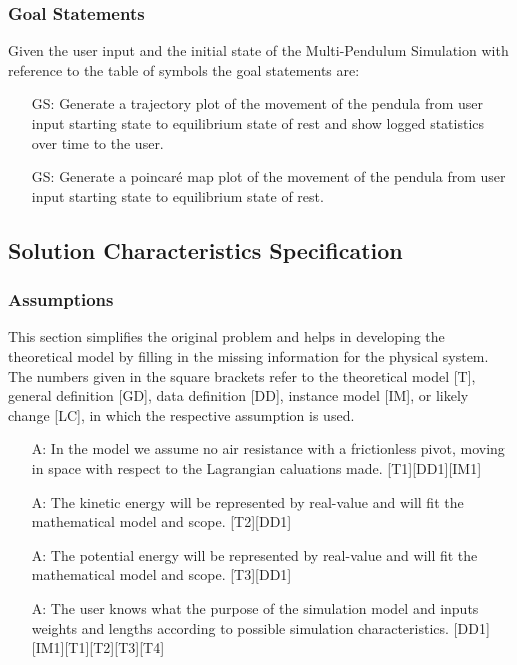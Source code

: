 \documentclass[12pt]{article}
\newcounter{assumpnum} %
\newcounter{goalnum} %
\newcommand{\progname}{Multi-Pendulum Simulation }
\begin{document}
\subsubsection{Goal Statements}

\noindent Given the user input and the initial state of the \progname with reference to the table of symbols the goal
statements are:

\begin{itemize}
\item[GS\refstepcounter{goalnum}\thegoalnum:] Generate a trajectory plot of 
the movement of the pendula from user input starting state to equilibrium state of rest and show logged
statistics over time to the user.
\item[GS\refstepcounter{goalnum}\thegoalnum:] Generate a poincaré map plot of 
the movement of the pendula from user input starting state to equilibrium state of rest.
\end{itemize}


\newpage

\subsection{Solution Characteristics Specification}

\subsubsection{Assumptions}

This section simplifies the original problem and helps in developing the
theoretical model by filling in the missing information for the physical
system. The numbers given in the square brackets refer to the theoretical model
[T], general definition [GD], data definition [DD], instance model [IM], or
likely change [LC], in which the respective assumption is used.

\begin{itemize}
\item[A\refstepcounter{assumpnum}\theassumpnum \label{A:equation}:]
In the model we assume no air resistance with a frictionless pivot, moving in space with respect to the Lagrangian caluations made. [T1][DD1][IM1]
\item[A\refstepcounter{assumpnum}\theassumpnum \label{A:kinetic}:]
  The kinetic energy will be represented by real-value and will fit the mathematical model and scope. [T2][DD1]
\item[A\refstepcounter{assumpnum}\theassumpnum \label{A:poten}:]
  The potential energy will be represented by real-value and will fit the mathematical model and scope. [T3][DD1]
\item[A\refstepcounter{assumpnum}\theassumpnum \label{A:init-user}:]
The user knows what the purpose of the simulation model and inputs weights and lengths
according to possible simulation characteristics. [DD1][IM1][T1][T2][T3][T4]
\end{itemize}
\end{document}
